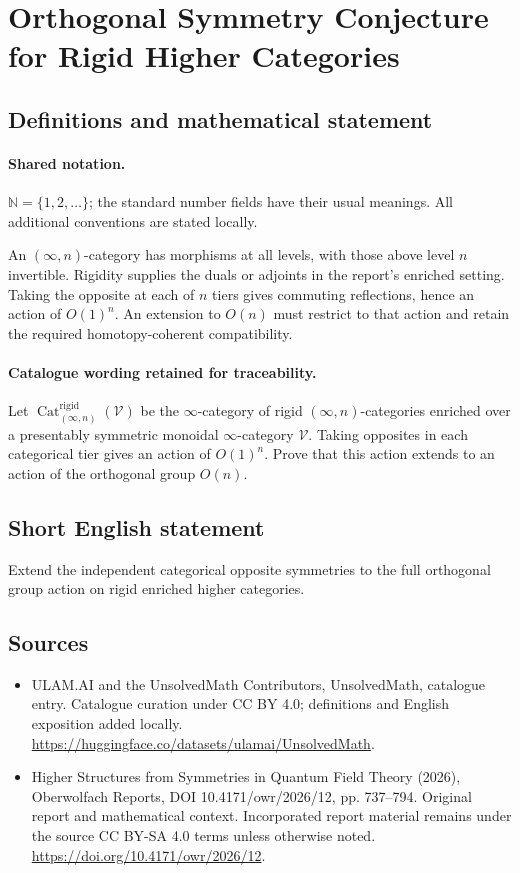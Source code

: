 \documentclass[11pt]{article}
\begin{document}
\section{Orthogonal Symmetry Conjecture for Rigid Higher Categories}\label{statement}

\subsection{Definitions and mathematical statement}

\paragraph{Shared notation.}$\mathbb N=\{1,2,\ldots\}$; the standard number fields have their usual meanings. All additional conventions are stated locally.


An $(\infty,n)$-category has morphisms at all levels, with those above level $n$ invertible. Rigidity supplies the duals or adjoints in the report's enriched setting. Taking the opposite at each of $n$ tiers gives commuting reflections, hence an action of $O(1)^n$. An extension to $O(n)$ must restrict to that action and retain the required homotopy-coherent compatibility.

\paragraph{Catalogue wording retained for traceability.}
Let $\operatorname{Cat}^{\mathrm{rigid}}_{(\infty,n)}(\mathcal{V})$ be the $\infty$-category of rigid $(\infty,n)$-categories enriched over a presentably symmetric monoidal $\infty$-category $\mathcal{V}$. Taking opposites in each categorical tier gives an action of $O(1)^n$. Prove that this action extends to an action of the orthogonal group $O(n)$.
\subsection{Short English statement}
Extend the independent categorical opposite symmetries to the full orthogonal group action on rigid enriched higher categories.
\subsection{Sources}
\begin{itemize}
\item[\hypertarget{source:statement:1}{S1}] ULAM.AI and the UnsolvedMath Contributors, UnsolvedMath, catalogue entry. Catalogue curation under CC BY 4.0; definitions and English exposition added locally.
\url{https://huggingface.co/datasets/ulamai/UnsolvedMath}.
\item[\hypertarget{source:statement:2}{S2}] Higher Structures from Symmetries in Quantum Field Theory (2026), Oberwolfach Reports, DOI 10.4171/owr/2026/12, pp. 737--794. Original report and mathematical context. Incorporated report material remains under the source CC BY-SA 4.0 terms unless otherwise noted.
\url{https://doi.org/10.4171/owr/2026/12}.
\end{itemize}
\label{end:statement}
\end{document}
